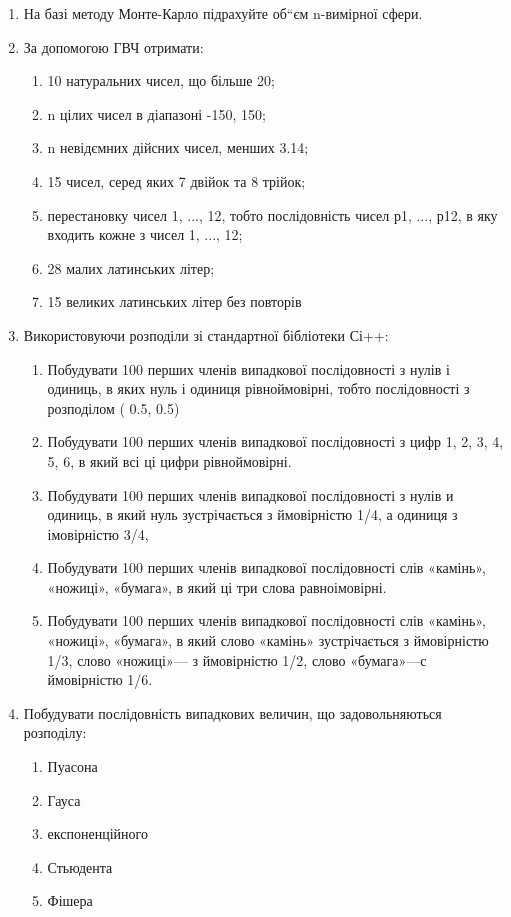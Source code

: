 \documentclass[]{article}
\makeatletter
\newcommand{\xslalph}[1]{\expandafter\@xslalph\csname c@#1\endcsname}
\newcommand{\@xslalph}[1]{%
    \ifcase#1\or а\or б\or в\or г\or д\or e\or є\or ж\or з\or i%
    \or й\or к\or л\or м\or н\or о\or п\or р\or с\or т%
    \or у\or ф\or х\or ц\or ч\or ш\or ю\or я\or аа\or бб\or вв %
    \else\@ctrerr\fi%
}
\makeatother
\begin{document}
\begin{enumerate}
\item
 На базі методу Монте-Карло підрахуйте об``єм n-вимірної сфери.
\item
За допомогою ГВЧ отримати:
\begin{enumerate}[label=\xslalph*)]
\item 10 натуральних чисел, що більше 20;
\item n цілих чисел в діапазоні -150, 150;
\item n не­відємних дійсних чисел, менших 3.14;
\item 15 чисел, серед яких 7 двійок та 8 трійок;
\item перестановку чисел 1, ..., 12, тобто послідовність чисел р1, ...,
р12, в яку входить кожне з чисел 1, ..., 12;
\item 28 малих латинських літер;
\item 15 великих латинських літер без повторів
\end{enumerate}

\item
Використовуючи розподіли зі стандартної бібліотеки Сі++:
\begin{enumerate}[label=\xslalph*)]
\item
 Побудувати 100 перших членів випадкової послідовності з нулів і
одиниць, в яких нуль і одиниця рівноймовірні, тобто послідовності з
розподілом ( 0.5, 0.5)

\item Побудувати 100 перших членів випадкової послідовності з цифр 1, 2, 3,
4, 5, 6, в який всі ці цифри рівноймовірні.

\item Побудувати 100 перших членів випадкової послідовності з нулів и
одиниць, в який нуль зустрічається з ймовірністю 1/4, а одиниця з
імовірністю 3/4,

\item Побудувати 100 перших членів випадкової послідовності слів «камінь»,
«ножиці», «бумага», в який ці три слова равноімовірні.

\item Побудувати 100 перших членів випадкової послідовності слів «камінь»,
«ножиці», «бумага», в який слово «камінь» зустрічається з ймовірністю
1/3, слово «ножиці»--- з ймовірністю 1/2, слово «бумага»---с ймовірністю
1/6.
\end{enumerate}

\item
Побудувати послідовність випадкових величин, що задовольняються
розподілу:
\begin{enumerate}[label=\xslalph*)]
\item Пуасона
\item Гауса
\item експоненційного
\item Стьюдента
\item Фішера
\end{enumerate}


\end{enumerate}
\end{document}
